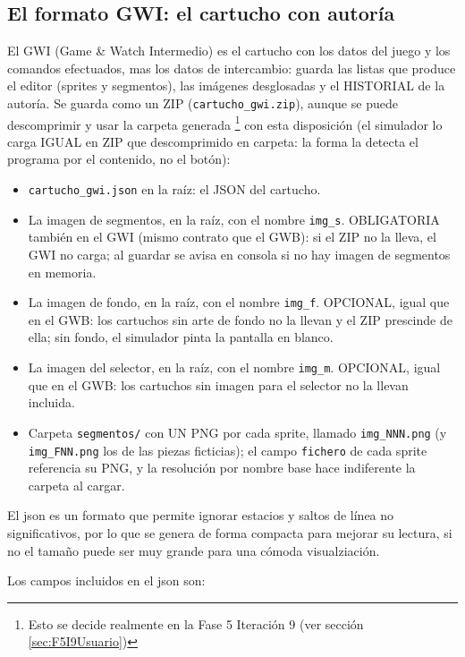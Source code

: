 \subsection*{El formato GWI: el cartucho con autoría}
\label{sec:F1A01GWI}

El GWI (Game \& Watch Intermedio) es el cartucho con los datos del juego y los comandos efectuados, mas los datos de intercambio: guarda las listas que produce el editor (sprites y segmentos),
las imágenes desglosadas y el HISTORIAL de la autoría. Se guarda como un ZIP
(\texttt{cartucho\_gwi.zip}), aunque se puede descomprimir y usar la carpeta generada \footnote{Esto se decide realmente en la Fase 5 Iteración 9 (ver sección \ref{sec:F5I9Usuario})} con esta disposición (el simulador lo carga
IGUAL en ZIP que descomprimido en carpeta: la forma la detecta el
programa por el contenido, no el botón):

\begin{itemize}
	\item \texttt{cartucho\_gwi.json} en la raíz: el JSON del cartucho.
	\item La imagen de segmentos, en la raíz, con el nombre 
	\texttt{img\_s}. OBLIGATORIA también en el GWI (mismo contrato que el GWB): si el ZIP no la lleva, el GWI no carga; al guardar se avisa en consola si no hay imagen de segmentos en memoria.
	\item La imagen de fondo, en la raíz, con el nombre \texttt{img\_f}. OPCIONAL, igual que en el GWB: los cartuchos sin arte de fondo no la llevan y el ZIP prescinde de ella; sin fondo, el simulador pinta la pantalla en blanco.
	\item La imagen del selector, en la raíz, con el nombre \texttt{img\_m}. OPCIONAL, igual que en el GWB: los cartuchos sin imagen para el selector no la llevan incluida.
	\item Carpeta \texttt{segmentos/} con UN PNG por cada sprite, llamado
	\texttt{img\_NNN.png} (y \texttt{img\_FNN.png} los de las piezas
	ficticias); el campo \texttt{fichero} de cada sprite referencia su
	PNG, y la resolución por nombre base hace indiferente la carpeta al
	cargar.
\end{itemize}

El json es un formato que permite ignorar estacios y saltos de línea no significativos, por lo que se genera de forma compacta para mejorar su lectura, si no el tamaño puede ser muy grande para una cómoda visualziación.

Los campos incluidos en el json son:

